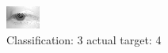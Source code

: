 \begin{figure}[h!]
\begin{center}
\includegraphics[width=0.60\columnwidth]{figures/ID2700_class_3_target_4.png}
\end{center}
\caption{ Classification: 3 actual target: 4}
\label{fig:ID2700_class_3_target_4}
\end{figure}

